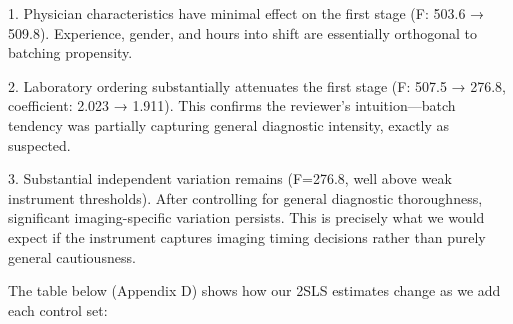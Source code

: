 \documentclass[11pt]{article}
\newcommand{\1}{\hbox{\rm 1\kern-.35em 1}}
\begin{document}
1. Physician characteristics have minimal effect on the first stage (F: 503.6 → 509.8). Experience, gender, and hours into shift are essentially orthogonal to batching propensity.

2. Laboratory ordering substantially attenuates the first stage (F: 507.5 → 276.8, coefficient: 2.023 → 1.911). This confirms the reviewer's intuition—batch tendency was partially capturing general diagnostic intensity, exactly as suspected.

3. Substantial independent variation remains (F=276.8, well above weak instrument thresholds). After controlling for general diagnostic thoroughness, significant imaging-specific variation persists. This is precisely what we would expect if the instrument captures imaging timing decisions rather than purely general cautiousness.

The table below (Appendix D) shows how our 2SLS estimates change as we add each control set:
\end{document}

